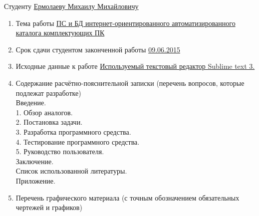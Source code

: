 \documentclass[14pt,a4paper]{extreport}
\begin{document}
	\medskip
	\endcenter
	\raggedright
	Студенту \underline{Ермолаеву Михаилу Михайловичу}\\
	\begin{enumerate}
	\item Тема работы \underline{ ПС и БД  интернет-ориентированного автоматизированного каталога комплектующих ПК
 }\\
	\item Срок сдачи студентом законченной работы \underline{09.06.2015}
	\item Исходные данные к работе \underline{Используемый текстовый редактор Sublime text 3. }
	\item Содержание расчётно-пояснительной записки (перечень вопросов, которые подлежат разработке)\\
	\underline{\hspace*{16cm}}\hspace*{-16cm}Введение.\\
    \underline{\hspace*{16cm}}\hspace*{-16cm}1. Обзор аналогов.\\
    \underline{\hspace*{16cm}}\hspace*{-16cm}2. Постановка задачи.\\
	\underline{\hspace*{16cm}}\hspace*{-16cm}3. Разработка программного средства.\\
    \underline{\hspace*{16cm}}\hspace*{-16cm}4. Тестирование программного средства. \\
    \underline{\hspace*{16cm}}\hspace*{-16cm}5. Руководство пользователя. \\
    \underline{\hspace*{16cm}}\hspace*{-16cm}Заключение. \\
	\underline{\hspace*{16cm}}\hspace*{-16cm}Список использованной литературы.\\
    \underline{\hspace*{16cm}}\hspace*{-16cm}Приложение. \\
	\item Перечень графического материала (с точным обозначением обязательных чертежей и графиков)\\

\end{enumerate}
\end{document}
